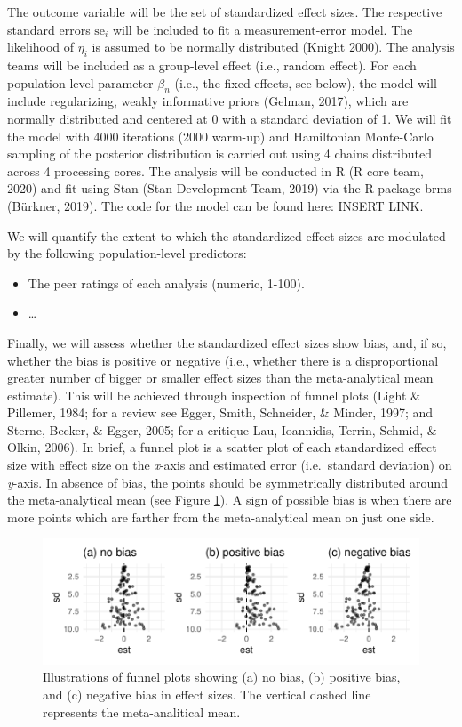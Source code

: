 \documentclass[
  english,
  man]{apa6}
\providecommand{\tightlist}{%
  \setlength{\itemsep}{0pt}\setlength{\parskip}{0pt}}
\begin{document}
The outcome variable will be the set of standardized effect sizes.
The respective standard errors \(\text{se}_i\) will be included to fit a measurement-error model.
The likelihood of \(\eta_i\) is assumed to be normally distributed (Knight 2000).
The analysis teams will be included as a group-level effect (i.e., random effect).
For each population-level parameter \(\beta_n\) (i.e., the fixed effects, see below), the model will include regularizing, weakly informative priors (Gelman, 2017), which are normally distributed and centered at 0 with a standard deviation of 1.
We will fit the model with 4000 iterations (2000 warm-up) and Hamiltonian Monte-Carlo sampling of the posterior distribution is carried out using 4 chains distributed across 4 processing cores.
The analysis will be conducted in R (R core team, 2020) and fit using Stan (Stan Development Team, 2019) via the R package brms (Bürkner, 2019).
The code for the model can be found here: INSERT LINK.

We will quantify the extent to which the standardized effect sizes are modulated by the following population-level predictors:

\begin{itemize}
\tightlist
\item
  The peer ratings of each analysis (numeric, 1-100).
\item
  \ldots{}
\end{itemize}

Finally, we will assess whether the standardized effect sizes show bias, and, if so, whether the bias is positive or negative (i.e., whether there is a disproportional greater number of bigger or smaller effect sizes than the meta-analytical mean estimate).
This will be achieved through inspection of funnel plots (Light \& Pillemer, 1984; for a review see Egger, Smith, Schneider, \& Minder, 1997; and Sterne, Becker, \& Egger, 2005; for a critique Lau, Ioannidis, Terrin, Schmid, \& Olkin, 2006).
In brief, a funnel plot is a scatter plot of each standardized effect size with effect size on the \emph{x}-axis and estimated error (i.e.~standard deviation) on \emph{y}-axis.
In absence of bias, the points should be symmetrically distributed around the meta-analytical mean (see Figure \ref{fig:funnel-plot}).
A sign of possible bias is when there are more points which are farther from the meta-analytical mean on just one side.

\begin{figure}
\centering
\includegraphics{Draft_RR_files/figure-latex/funnel-plot-1.pdf}
\caption{\label{fig:funnel-plot}Illustrations of funnel plots showing (a) no bias, (b) positive bias, and (c) negative bias in effect sizes. The vertical dashed line represents the meta-analitical mean.}
\end{figure}
\end{document}
